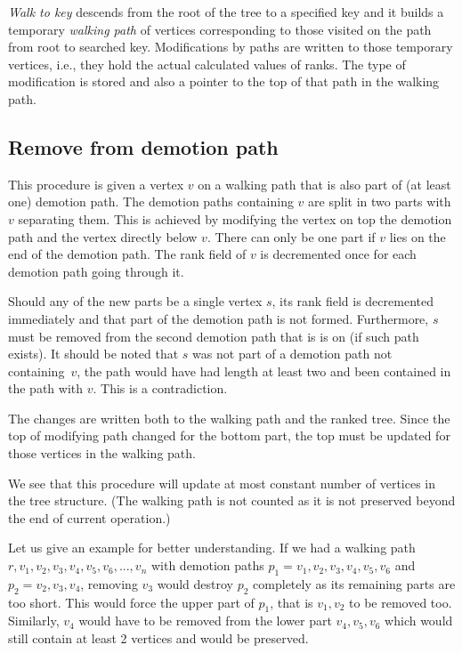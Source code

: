 \emph{Walk to key} descends from the root of the tree to a specified key and it builds a temporary {\em walking path} of vertices corresponding to those visited on the path from root to searched key. Modifications by paths are written to those temporary vertices, i.e., they hold the actual calculated values of ranks. The type of modification is stored and also a pointer to the top of that path in the walking path.

\subsection{Remove from demotion path}

This procedure is given a vertex $v$ on a walking path that is also part of (at least one) demotion path. The demotion paths containing $v$ are split in two parts with $v$ separating them. This is achieved by modifying the vertex on top the demotion path and the vertex directly below $v$. There can only be one part if $v$ lies on the end of the demotion path. The rank field of $v$ is decremented once for each demotion path going through it. 

Should any of the new parts be a single vertex $s$, its rank field is decremented immediately and that part of the demotion path is not formed. Furthermore, $s$ must be removed from the second demotion path that is is on (if such path exists). It should be noted that $s$ was not part of a demotion path not containing~$v$, the path would have had length at least two and been contained in the path with $v$. This is a contradiction. 

The changes are written both to the walking path and the ranked tree. Since the top of modifying path changed for the bottom part, the top must be updated for those vertices in the walking path.

We see that this procedure will update at most constant number of vertices in the tree structure. (The walking path is not counted as it is not preserved beyond the end of current operation.)

Let us give an example for better understanding. If we had a walking path $r,v_1,v_2,v_3,v_4,v_5,v_6,...,v_n$ with demotion paths $p_1 = v_1,v_2,v_3,v_4,v_5,v_6$ and $p_2 = v_2,v_3,v_4$, removing $v_3$ would destroy $p_2$ completely as its remaining parts are too short. This would force the upper part of $p_1$, that is $v_1,v_2$ to be removed too. Similarly, $v_4$ would have to be removed from the lower part $v_4,v_5,v_6$ which would still contain at least 2 vertices and would be preserved.

